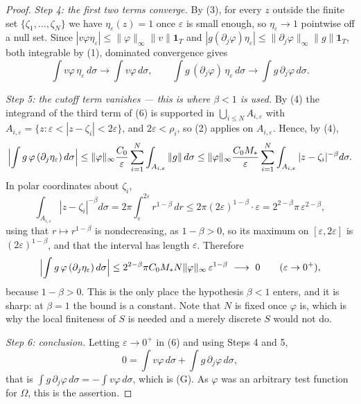 \begin{proof}
\emph{Step 4: the first two terms converge.}  By (3), for every $z$ outside the
finite set $\{\zeta_1,\dots,\zeta_N\}$ we have $\eta_\varepsilon(z)=1$ once
$\varepsilon$ is small enough, so $\eta_\varepsilon\to1$ pointwise off a null
set.  Since
$|v\varphi\eta_\varepsilon|\le\|\varphi\|_\infty\|v\|\mathbf{1}_T$ and
$|g(\partial_j\varphi)\eta_\varepsilon|\le\|\partial_j\varphi\|_\infty\|g\|\mathbf{1}_T$,
both integrable by (1), dominated convergence gives
\[
  \int v\varphi\,\eta_\varepsilon\,d\sigma\to\int v\varphi\,d\sigma,
  \qquad
  \int g\,(\partial_j\varphi)\,\eta_\varepsilon\,d\sigma
  \to\int g\,\partial_j\varphi\,d\sigma .
\]

\emph{Step 5: the cutoff term vanishes --- this is where $\beta<1$ is used.}
By (4) the integrand of the third term of (6) is supported in
$\bigcup_{i\le N}A_{i,\varepsilon}$ with
$A_{i,\varepsilon}=\{z:\varepsilon<|z-\zeta_i|<2\varepsilon\}$, and
$2\varepsilon<\rho_i$, so (2) applies on $A_{i,\varepsilon}$.  Hence, by (4),
\[
  \Bigl|\int g\,\varphi\,(\partial_j\eta_\varepsilon)\,d\sigma\Bigr|
  \le\|\varphi\|_\infty\frac{C_0}{\varepsilon}\sum_{i=1}^{N}
    \int_{A_{i,\varepsilon}}\|g\|\,d\sigma
  \le\|\varphi\|_\infty\frac{C_0M_*}{\varepsilon}\sum_{i=1}^{N}
    \int_{A_{i,\varepsilon}}|z-\zeta_i|^{-\beta}d\sigma .
\]
In polar coordinates about $\zeta_i$,
\[
  \int_{A_{i,\varepsilon}}|z-\zeta_i|^{-\beta}d\sigma
  =2\pi\int_{\varepsilon}^{2\varepsilon}r^{1-\beta}\,dr
  \le2\pi(2\varepsilon)^{1-\beta}\cdot\varepsilon
  =2^{2-\beta}\pi\,\varepsilon^{2-\beta},
\]
using that $r\mapsto r^{1-\beta}$ is nondecreasing, as $1-\beta>0$, so its
maximum on $[\varepsilon,2\varepsilon]$ is $(2\varepsilon)^{1-\beta}$, and that
the interval has length $\varepsilon$.  Therefore
\[
  \Bigl|\int g\,\varphi\,(\partial_j\eta_\varepsilon)\,d\sigma\Bigr|
  \le 2^{2-\beta}\pi C_0M_*N\|\varphi\|_\infty\,\varepsilon^{1-\beta}
  \ \longrightarrow\ 0\qquad(\varepsilon\to0^{+}),
\]
because $1-\beta>0$.  This is the only place the hypothesis $\beta<1$ enters,
and it is sharp: at $\beta=1$ the bound is a constant.  Note that $N$ is fixed
once $\varphi$ is, which is why the local finiteness of $S$ is needed and a
merely discrete $S$ would not do.

\emph{Step 6: conclusion.}  Letting $\varepsilon\to0^{+}$ in (6) and using
Steps 4 and 5,
\[
  0=\int v\varphi\,d\sigma+\int g\,\partial_j\varphi\,d\sigma ,
\]
that is $\int g\,\partial_j\varphi\,d\sigma=-\int v\varphi\,d\sigma$, which is
(G).  As $\varphi$ was an arbitrary test function for $\Omega$, this is the
assertion.
\end{proof}
